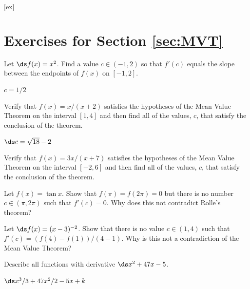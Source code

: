 [ex]
\section*{Exercises for Section \ref{sec:MVT}}

\begin{enumialphparenastyle}

\begin{ex}
 Let $\ds f(x) = x^2$.
Find a value $c\in (-1,2)$ so that $f'(c)$ equals the slope between
the endpoints of $f(x)$ on $[-1,2]$.
\begin{sol}
 $c=1/2$
\end{sol}
\end{ex}

\begin{ex}
 Verify that $f(x) = x/(x+2)$ satisfies the hypotheses of the
 Mean Value Theorem on the interval $[1,4]$ and then find all of the
 values, $c$, that satisfy the conclusion of the theorem.
\begin{sol}
 $\ds c=\sqrt{18}-2$
\end{sol}
\end{ex}

\begin{ex}
Verify that $f(x) = 3x/(x+7)$ satisfies the hypotheses of the
 Mean Value Theorem on the interval $[-2 , 6]$ and then find all of the
 values, $c$, that satisfy the conclusion of the theorem.
\end{ex}

\begin{ex}
 Let $f(x) = \tan x $. Show that $f(\pi ) = f(2\pi)=0$ but
there is no number $c\in (\pi,2\pi)$ such that $f'(c) =0$. Why does
this not contradict Rolle's theorem?
\end{ex}

\begin{ex}
 Let $\ds f(x) = (x-3)^{-2}$.  Show that there is no value 
$c\in (1,4)$ such that $f'(c) = (f(4)-f(1))/(4-1)$.  Why is
this not a contradiction of the Mean Value Theorem?
\end{ex}

\begin{ex}
 Describe all functions with derivative $\ds x^2+47x-5$.
\begin{sol}
 $\ds x^3/3+47x^2/2-5x+k$
\end{sol}
\end{ex}


\end{enumialphparenastyle}
